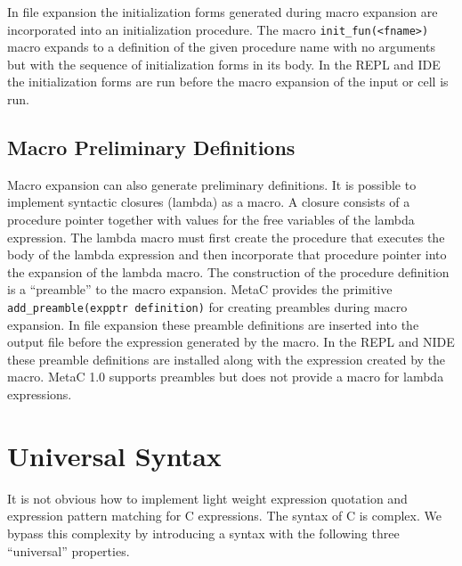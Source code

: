 \documentclass{article}
\begin{document}
In file expansion the initialization forms generated during macro expansion are incorporated into an initialization procedure.
The macro {\tt init\_fun(<fname>)} macro expands to a definition of the given procedure name with no arguments but with the sequence
of initialization forms in its body.  In the REPL and IDE the initialization forms are run before the macro expansion of the input or cell is run.

\subsection{Macro Preliminary Definitions}


Macro expansion can also generate preliminary definitions.  It is
possible to implement syntactic closures (lambda) as a macro.  A
closure consists of a procedure pointer together with values for the
free variables of the lambda expression.  The lambda macro
must first create the procedure that executes the body of the lambda
expression and then incorporate that procedure pointer into the
expansion of the lambda macro.  The construction of the procedure
definition is a ``preamble'' to the macro expansion.  MetaC provides
the primitive {\tt add\_preamble(expptr definition)} for creating
preambles during macro expansion.  In file expansion these preamble
definitions are inserted into the output file before the expression
generated by the macro.  In the REPL and NIDE these preamble
definitions are installed along with the expression created by the
macro.  MetaC 1.0 supports preambles but does not provide a macro for
lambda expressions.

\section{Universal Syntax}

It is not obvious how to implement light weight expression quotation and expression pattern matching for C expressions.  The syntax of C is complex.
We bypass this complexity by introducing a syntax with the following three ``universal'' properties.
\end{document}
